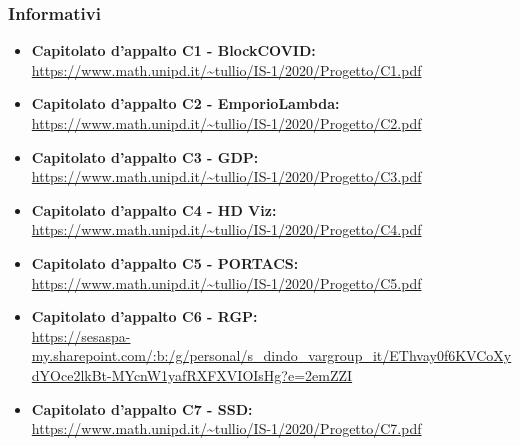 \subsubsection{Informativi}
\begin{itemize}
\item \textbf{Capitolato d'appalto C1 - BlockCOVID:}\\
\url{https://www.math.unipd.it/~tullio/IS-1/2020/Progetto/C1.pdf}
\item \textbf{Capitolato d'appalto C2 - EmporioLambda:}\\
\url{https://www.math.unipd.it/~tullio/IS-1/2020/Progetto/C2.pdf}
\item \textbf{Capitolato d'appalto C3 - GDP:}\\
\url{https://www.math.unipd.it/~tullio/IS-1/2020/Progetto/C3.pdf}
\item \textbf{Capitolato d'appalto C4 - HD Viz:}\\
\url{https://www.math.unipd.it/~tullio/IS-1/2020/Progetto/C4.pdf}
\item \textbf{Capitolato d'appalto C5 - PORTACS:}\\
\url{https://www.math.unipd.it/~tullio/IS-1/2020/Progetto/C5.pdf}
\item \textbf{Capitolato d'appalto C6 - RGP:}\\
\url{https://sesaspa-my.sharepoint.com/:b:/g/personal/s_dindo_vargroup_it/EThvay0f6KVCoXydYOce2lkBt-MYcnW1yafRXFXVIOIsHg?e=2emZZI}
\item \textbf{Capitolato d'appalto C7 - SSD:}\\
\url{https://www.math.unipd.it/~tullio/IS-1/2020/Progetto/C7.pdf}
\end{itemize}
